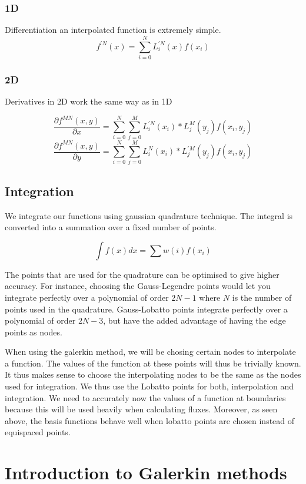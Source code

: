 \documentclass[11pt]{article}
\begin{document}
\subsubsection{1D}\label{d}

Differentiation an interpolated function is extremely simple.
\[f^{'N}(x) = \sum_{i=0}^{N}L_i^{'N}(x)f(x_i)\]

\subsubsection{2D}\label{d-1}

Derivatives in 2D work the same way as in 1D

\[\frac{\partial f^{MN}(x,y)}{\partial x} = \sum_{i=0}^{N} \sum_{j=0}^{M} L_i^{'N}(x_i) * L_j^{M}(y_j) f(x_i,y_j)\]
\[\frac{\partial f^{MN}(x,y)}{\partial y} = \sum_{i=0}^{N} \sum_{j=0}^{M} L_i^{N}(x_i) * L_j^{'M}(y_j) f(x_i,y_j)\]

    \subsection{Integration}\label{integration}

We integrate our functions using gaussian quadrature technique. The
integral is converted into a summation over a fixed number of points.

\[\int f(x) dx = \sum w(i)f(x_i)\]

The points that are used for the quadrature can be optimised to give
higher accuracy. For instance, choosing the Gauss-Legendre points would
let you integrate perfectly over a polynomial of order \(2N-1\) where
\(N\) is the number of points used in the quadrature. Gauss-Lobatto
points integrate perfectly over a polynomial of order \(2N-3\), but have
the added advantage of having the edge points as nodes.

When using the galerkin method, we will be chosing certain nodes to
interpolate a function. The values of the function at these points will
thus be trivially known. It thus makes sense to choose the interpolating
nodes to be the same as the nodes used for integration. We thus use the
Lobatto points for both, interpolation and integration. We need to
accurately now the values of a function at boundaries because this will
be used heavily when calculating fluxes. Moreover, as seen above, the
basis functions behave well when lobatto points are chosen instead of
equispaced points.

    \section{Introduction to Galerkin
methods}\label{introduction-to-galerkin-methods}
\end{document}
